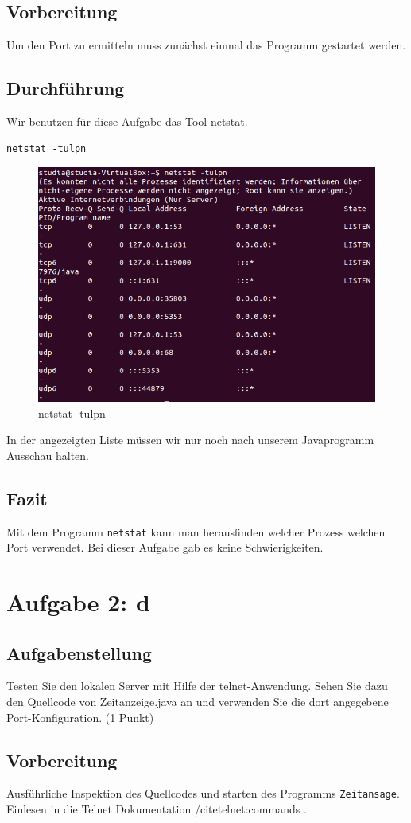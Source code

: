 \subsection{Vorbereitung}
Um den Port zu ermitteln muss zunächst einmal das Programm gestartet werden.

\subsection{Durchführung}
Wir benutzen für diese Aufgabe das Tool netstat.
\begin{lstlisting}
netstat -tulpn
\end{lstlisting}

\begin{figure}[H]
	\centering
	\includegraphics[width=0.4 \linewidth]{images/15}
	\caption{netstat -tulpn}
\end{figure}
In der angezeigten Liste müssen wir nur noch nach unserem Javaprogramm Ausschau halten.

\subsection{Fazit}
Mit dem Programm \texttt{netstat} kann man herausfinden welcher Prozess welchen Port verwendet. Bei dieser Aufgabe gab es keine Schwierigkeiten.

\section{Aufgabe 2: d}

\subsection{Aufgabenstellung}
Testen Sie den lokalen Server mit Hilfe der telnet-Anwendung. Sehen Sie dazu den Quellcode von Zeitanzeige.java an und verwenden Sie die dort angegebene Port-Konfiguration. (1 Punkt)

\subsection{Vorbereitung}
Ausführliche Inspektion des Quellcodes und starten des Programms \texttt{Zeitansage}.
Einlesen in die Telnet Dokumentation /cite{telnet:commands }.

